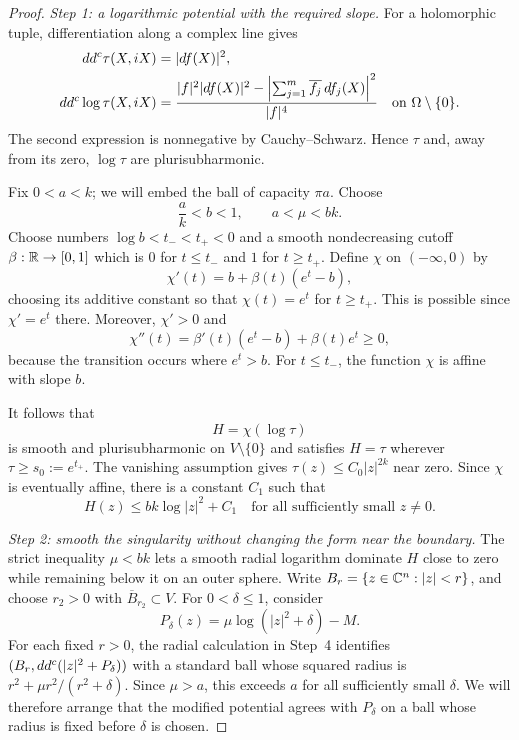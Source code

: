 \begin{proof}
\noindent\textit{Step 1: a logarithmic potential with the required slope.}
For a holomorphic tuple, differentiation along a complex line gives
\begin{align}
 dd^c\tau(X,iX)&=|df(X)|^2,\notag\\
 dd^c\log\tau(X,iX)
 &=\frac{|f|^2|df(X)|^2
       -\left|\sum_{j=1}^m\overline{f_j}\,df_j(X)\right|^2}{|f|^4}
 \quad\text{on }\Omega\setminus\{0\}.
 \label{eq:ball-log-levi}
\end{align}
The second expression is nonnegative by Cauchy--Schwarz.  Hence $\tau$
and, away from its zero, $\log\tau$ are plurisubharmonic.

Fix $0<a<k$; we will embed the ball of capacity $\pi a$.  Choose
\[
 \frac ak<b<1,\qquad a<\mu<bk.
\]
Choose numbers $\log b<t_-<t_+<0$ and a smooth nondecreasing cutoff
$\beta:\mathbb R\to[0,1]$ which is $0$ for $t\le t_-$ and $1$ for $t\ge t_+$.
Define $\chi$ on $(-\infty,0)$ by
\[
 \chi'(t)=b+\beta(t)(e^t-b),
\]
choosing its additive constant so that $\chi(t)=e^t$ for $t\ge t_+$.
This is possible since $\chi'=e^t$ there.  Moreover, $\chi'>0$ and
\[
 \chi''(t)=\beta'(t)(e^t-b)+\beta(t)e^t\ge0,
\]
because the transition occurs where $e^t>b$.  For $t\le t_-$, the
function $\chi$ is affine with slope $b$.

It follows that
\[
 H=\chi(\log\tau)
\]
is smooth and plurisubharmonic on $V\setminus\{0\}$ and satisfies
$H=\tau$ wherever $\tau\ge s_0:=e^{t_+}$.  The vanishing assumption gives
$\tau(z)\le C_0|z|^{2k}$ near zero.  Since $\chi$ is eventually affine,
there is a constant $C_1$ such that
\begin{equation}
 H(z)\le bk\log|z|^2+C_1
 \quad\text{for all sufficiently small }z\ne0.
 \label{eq:ball-singularity}
\end{equation}

\medskip
\noindent\textit{Step 2: smooth the singularity without changing the form near the boundary.}
The strict inequality $\mu<bk$ lets a smooth radial logarithm dominate
$H$ close to zero while remaining below it on an outer sphere.
Write $B_r=\{z\in\mathbb C^n:|z|<r\}$, and choose $r_2>0$ with
$\overline{B}_{r_2}\subset V$.  For $0<\delta\le1$, consider
\[
 P_\delta(z)=\mu\log(|z|^2+\delta)-M.
\]
For each fixed $r>0$, the radial calculation in Step~4 identifies
$(B_r,dd^c(|z|^2+P_\delta))$ with a standard ball whose squared radius
is $r^2+\mu r^2/(r^2+\delta)$. Since $\mu>a$, this exceeds $a$ for
all sufficiently small $\delta$. We will therefore arrange that the
modified potential agrees with $P_\delta$ on a ball whose radius is
fixed before $\delta$ is chosen.


\end{proof}
